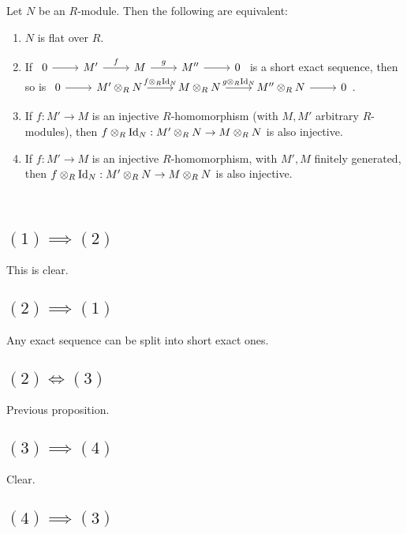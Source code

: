 \documentclass[x11names,reqno,14pt]{extarticle}
\begin{document}
\prop

Let $N$ be an $R$-module. Then the following are equivalent:

\begin{enumerate}

\item $N$ is flat over $R$. 

\item If $\exactshort{M'}{f}{M}{g}{M''}$ is a short exact sequence, then so is $\exactshort{M'\otimes_R N}{f\otimes_R\Id_N}{M\otimes_RN}{g\otimes_R\Id_N}{M''\otimes_R N}$.

\item If $f:M'\to M$ is an injective $R$-homomorphism (with $M, M'$ arbitrary $R$-modules), then $f\otimes_R\operatorname{\mathrm{Id}}_N:M'\otimes_RN\to M\otimes_RN$ is also injective.

\item If $f:M'\to M$ is an injective $R$-homomorphism, with $M', M$ finitely generated, then $f\otimes_R\operatorname{\mathrm{Id}}_N:M'\otimes_RN\to M\otimes_RN$ is also injective.

\end{enumerate}

\proof\,

\subsection*{$(1)\implies(2)$}

This is clear. 

\subsection*{$(2)\implies(1)$}

Any exact sequence can be split into short exact ones.

\subsection*{$(2)\iff(3)$}

Previous proposition.

\subsection*{$(3)\implies(4)$}

Clear.

\subsection*{$(4)\implies(3)$}
\end{document}
